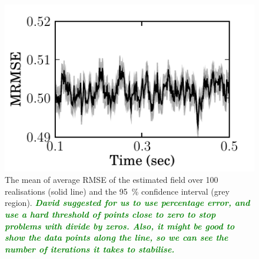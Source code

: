 \documentclass[twocolumn,11pt,a4paper]{article}		%
\newcommand{\dean}[1]{\textsf{\emph{\textbf{\textcolor{green}{#1}}}}}
\begin{document}
  \begin{figure}
   	\begin{center}
   		\includegraphics{./Graph/MRMSE.pdf} 
   	\end{center}
   	\caption{The mean of average RMSE of the estimated field over 100 realisations (solid line) and the 95~\% confidence interval (grey region). \dean{David suggested for us to use percentage error, and use a hard threshold of points close to zero to stop problems with divide by zeros. Also, it might be good to show the data points along the line, so we can see the number of iterations it takes to stabilise.}} 
\label{fig:RMSE}
   \end{figure}
\end{document}
